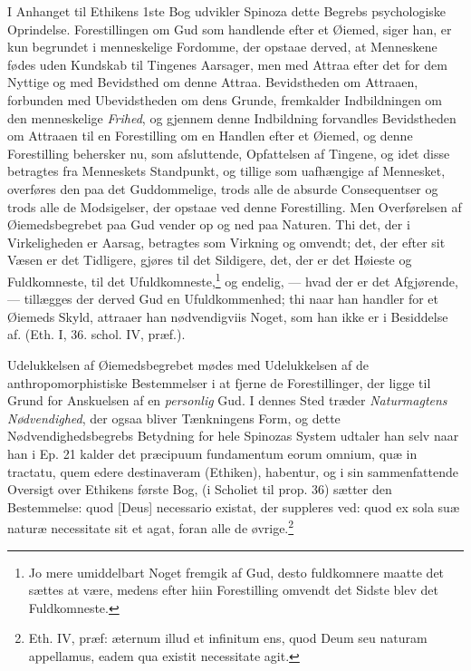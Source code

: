 \documentclass[12pt,a4paper]{book}
\newcommand{\opage}[1]{\marginnote{\footnotesize\textit{[#1]}}}
\begin{document}
I Anhanget til Ethikens 1ste Bog udvikler Spinoza dette Begrebs
psychologiske Oprindelse. Forestillingen om
\opage{67} \setcounter{footnote}{0}%
Gud som handlende efter et Øiemed, siger han, er kun begrundet i
menneskelige Fordomme, der opstaae derved, at Menneskene fødes
uden Kundskab til Tingenes Aarsager, men med Attraa efter det for
dem Nyttige og med Bevidsthed om denne Attraa. Bevidstheden om
Attraaen, forbunden med Ubevidstheden om dens Grunde, fremkalder
Indbildningen om den menneskelige \emph{Frihed}, og gjennem denne
Indbildning forvandles Bevidstheden om Attraaen til en
Forestilling om en Handlen efter et Øiemed, og denne Forestilling
behersker nu, som afsluttende, Opfattelsen af Tingene, og idet
disse betragtes fra Menneskets Standpunkt, og tillige som
uafhængige af Mennesket, overføres den paa det Guddommelige,
trods alle de absurde Consequentser og trods alle de Modsigelser,
der opstaae ved denne Forestilling. Men Overførelsen af
Øiemedsbegrebet paa Gud vender op og ned paa Naturen. Thi det,
der i Virkeligheden er Aarsag, betragtes som Virkning og
omvendt; det, der efter sit Væsen er det Tidligere, gjøres til
det Sildigere, det, der er det Høieste og Fuldkomneste, til det
Ufuldkomneste,\footnote{Jo mere umiddelbart Noget fremgik af Gud,
desto fuldkomnere maatte det sættes at være, medens efter hiin
Forestilling omvendt det Sidste blev det Fuldkomneste.} og
endelig, --- hvad der er det Afgjørende, --- tillægges der derved
Gud en Ufuldkommenhed; thi naar han handler for et Øiemeds Skyld,
attraaer han nødvendigviis Noget, som han ikke er i Besiddelse
af. (Eth. I, 36. schol. IV, præf.).

Udelukkelsen af Øiemedsbegrebet mødes med Udelukkelsen af de
anthropomorphistiske Bestemmelser i at fjerne de Forestillinger,
der ligge til Grund for Anskuelsen af en \emph{personlig} Gud. I dennes
Sted træder \emph{Naturmagtens Nødvendighed}, der ogsaa bliver
Tænkningens Form, og dette Nødvendighedsbegrebs Betydning for
hele Spinozas System udtaler han selv naar han i Ep. 21 kalder
det præcipuum fundamentum eorum omnium, quæ in tractatu, quem
edere destinaveram (Ethiken), habentur, og i sin sammenfattende
\opage{68} \setcounter{footnote}{0}%
Oversigt over Ethikens første Bog, (i Scholiet til prop. 36)
sætter den Bestemmelse: quod [Deus] necessario existat, der
suppleres ved: quod ex sola suæ naturæ necessitate sit et agat,
foran alle de øvrige.\footnote{Eth. IV, præf: æternum illud et
infinitum ens, quod Deum seu naturam appellamus, eadem qua
existit necessitate agit.}
\end{document}
